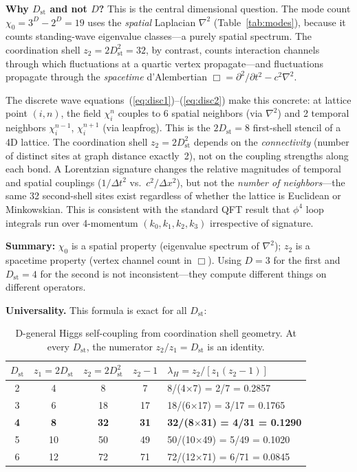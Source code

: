 \documentclass[12pt,a4paper]{article}
\newcommand{\chizero}{\chi_0}
\newcommand{\Dst}{D_{\mathrm{st}}}
\begin{document}
\textbf{Why $\Dst$ and not $D$?} This is the central dimensional question. The mode count $\chizero = 3^D - 2^D = 19$ uses the \textit{spatial} Laplacian $\nabla^2$ (Table~\ref{tab:modes}), because it counts standing-wave eigenvalue classes---a purely spatial spectrum. The coordination shell $z_2 = 2\Dst^2 = 32$, by contrast, counts interaction channels through which fluctuations at a quartic vertex propagate---and fluctuations propagate through the \textit{spacetime} d'Alembertian $\Box = \partial^2/\partial t^2 - c^2\nabla^2$.

The discrete wave equations~(\ref{eq:disc1})--(\ref{eq:disc2}) make this concrete: at lattice point $(i, n)$, the field $\chi_i^n$ couples to 6 spatial neighbors (via $\nabla^2$) and 2 temporal neighbors $\chi_i^{n-1}$, $\chi_i^{n+1}$ (via leapfrog). This is the $2\Dst = 8$ first-shell stencil of a 4D lattice. The coordination shell $z_2 = 2\Dst^2$ depends on the \textit{connectivity} (number of distinct sites at graph distance exactly~2), not on the coupling strengths along each bond. A Lorentzian signature changes the relative magnitudes of temporal and spatial couplings ($1/\Delta t^2$ vs.\ $c^2/\Delta x^2$), but not the \textit{number of neighbors}---the same 32 second-shell sites exist regardless of whether the lattice is Euclidean or Minkowskian. This is consistent with the standard QFT result that $\phi^4$ loop integrals run over 4-momentum $(k_0, k_1, k_2, k_3)$ irrespective of signature.

\textbf{Summary:} $\chizero$ is a spatial property (eigenvalue spectrum of $\nabla^2$); $z_2$ is a spacetime property (vertex channel count in $\Box$). Using $D = 3$ for the first and $\Dst = 4$ for the second is not inconsistent---they compute different things on different operators.

\textbf{Universality.} This formula is exact for all $\Dst$:

\begin{table}[h]
\centering
\begin{tabular}{ccccl}
\toprule
$\Dst$ & $z_1 = 2\Dst$ & $z_2 = 2\Dst^2$ & $z_2 - 1$ & $\lambda_H = z_2/[z_1(z_2-1)]$ \\
\midrule
2 & 4 & 8 & 7 & 8/(4$\times$7) = 2/7 = 0.2857 \\
3 & 6 & 18 & 17 & 18/(6$\times$17) = 3/17 = 0.1765 \\
\textbf{4} & \textbf{8} & \textbf{32} & \textbf{31} & \textbf{32/(8$\times$31) = 4/31 = 0.1290} \\
5 & 10 & 50 & 49 & 50/(10$\times$49) = 5/49 = 0.1020 \\
6 & 12 & 72 & 71 & 72/(12$\times$71) = 6/71 = 0.0845 \\
\bottomrule
\end{tabular}
\caption{D-general Higgs self-coupling from coordination shell geometry. At every $\Dst$, the numerator $z_2/z_1 = \Dst$ is an identity.}
\label{tab:z2}
\end{table}
\end{document}
